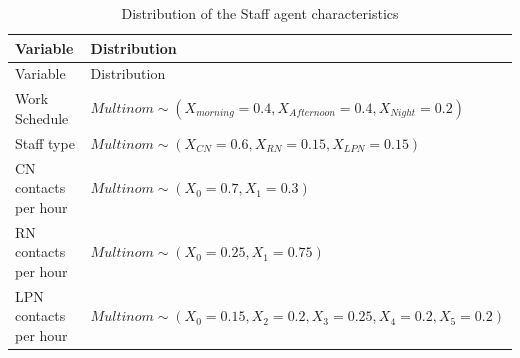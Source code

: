 \documentclass[
]{article}
\begin{document}
\begin{longtable}[]{@{}ll@{}}
\caption{Distribution of the Staff agent characteristics}\tabularnewline
\toprule
\begin{minipage}[b]{0.21\columnwidth}\raggedright
Variable\strut
\end{minipage} & \begin{minipage}[b]{0.73\columnwidth}\raggedright
Distribution\strut
\end{minipage}\tabularnewline
\midrule
\endfirsthead
\toprule
\begin{minipage}[b]{0.21\columnwidth}\raggedright
Variable\strut
\end{minipage} & \begin{minipage}[b]{0.73\columnwidth}\raggedright
Distribution\strut
\end{minipage}\tabularnewline
\midrule
\endhead
\begin{minipage}[t]{0.21\columnwidth}\raggedright
Work Schedule\strut
\end{minipage} & \begin{minipage}[t]{0.73\columnwidth}\raggedright
\(Multinom \sim (X_{morning} = 0.4, X_{Afternoon} = 0.4, X_{Night} = 0.2)\)\strut
\end{minipage}\tabularnewline
\begin{minipage}[t]{0.21\columnwidth}\raggedright
Staff type\strut
\end{minipage} & \begin{minipage}[t]{0.73\columnwidth}\raggedright
\(Multinom \sim (X_{CN} = 0.6, X_{RN} = 0.15, X_{LPN} = 0.15)\)\strut
\end{minipage}\tabularnewline
\begin{minipage}[t]{0.21\columnwidth}\raggedright
CN contacts per hour\strut
\end{minipage} & \begin{minipage}[t]{0.73\columnwidth}\raggedright
\(Multinom \sim (X_0 = 0.7, X_1 = 0.3)\)\strut
\end{minipage}\tabularnewline
\begin{minipage}[t]{0.21\columnwidth}\raggedright
RN contacts per hour\strut
\end{minipage} & \begin{minipage}[t]{0.73\columnwidth}\raggedright
\(Multinom \sim (X_0 = 0.25, X_1 = 0.75)\)\strut
\end{minipage}\tabularnewline
\begin{minipage}[t]{0.21\columnwidth}\raggedright
LPN contacts per hour\strut
\end{minipage} & \begin{minipage}[t]{0.73\columnwidth}\raggedright
\(Multinom \sim (X_0 = 0.15, X_2 = 0.2, X_3 = 0.25, X_4 = 0.2, X_5 = 0.2)\)\strut
\end{minipage}\tabularnewline
\bottomrule
\end{longtable}
\end{document}
